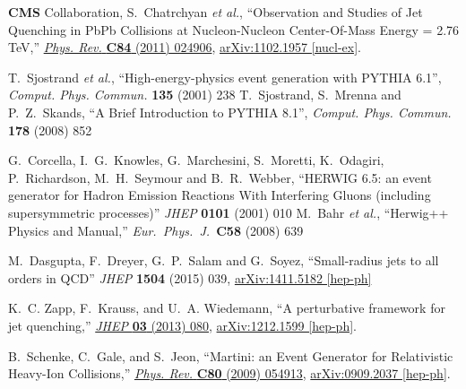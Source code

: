 \documentclass[a4paper,12pt]{article}
\numberwithin{equation}{section}
\begin{document}
\begin{thebibliography}{10}
{\bfseries CMS} Collaboration, S.~Chatrchyan {\em et al.}, ``{Observation and
  Studies of Jet Quenching in PbPb Collisions at Nucleon-Nucleon Center-Of-Mass
  Energy = 2.76 TeV},''
  \href{http://dx.doi.org/10.1103/PhysRevC.84.024906}{{\em Phys. Rev.}
  {\bfseries C84} (2011) 024906},
\href{http://arxiv.org/abs/1102.1957}{{\ttfamily arXiv:1102.1957 [nucl-ex]}}.




  T.~Sjostrand {\it et al.},
  ``{High-energy-physics event generation with PYTHIA 6.1}'',
  {\it Comput. Phys. Commun.}  {\bf 135} (2001) 238 
  T.~Sjostrand, S.~Mrenna and P.~Z.~Skands,
  ``{A Brief Introduction to PYTHIA 8.1}'',
  {\it Comput. Phys. Commun.}  {\bf 178} (2008) 852

  G.~Corcella, I.~G.~Knowles, G.~Marchesini, S.~Moretti, K.~Odagiri, P.~Richardson, M.~H.~Seymour and B.~R.~Webber,
  ``HERWIG 6.5: an event generator for Hadron Emission Reactions With Interfering Gluons (including supersymmetric processes)'' {\it JHEP} {\bf 0101} (2001) 010 %
  M.~Bahr {\it et al.},
  ``Herwig++ Physics and Manual,''
  {\it Eur.\ Phys.\ J.\ }{\bf C58} (2008) 639




  M.~Dasgupta, F.~Dreyer, G.~P.~Salam and G.~Soyez, ``Small-radius jets to all orders in QCD''
  {\it JHEP} {\bf 1504} (2015) 039,
  \href{https://arxiv.org/abs/1411.5182}{{\ttfamily arXiv:1411.5182 [hep-ph]}}



K.~C. Zapp, F.~Krauss, and U.~A. Wiedemann, ``{A perturbative framework for jet
  quenching},'' \href{http://dx.doi.org/10.1007/JHEP03(2013)080}{{\em JHEP}
  {\bfseries 03} (2013) 080},
\href{http://arxiv.org/abs/1212.1599}{{\ttfamily arXiv:1212.1599 [hep-ph]}}.


B.~Schenke, C.~Gale, and S.~Jeon, ``{Martini: an Event Generator for
  Relativistic Heavy-Ion Collisions},''
  \href{http://dx.doi.org/10.1103/PhysRevC.80.054913}{{\em Phys. Rev.}
  {\bfseries C80} (2009) 054913},
\href{http://arxiv.org/abs/0909.2037}{{\ttfamily arXiv:0909.2037 [hep-ph]}}.



\end{thebibliography}
\end{document}
